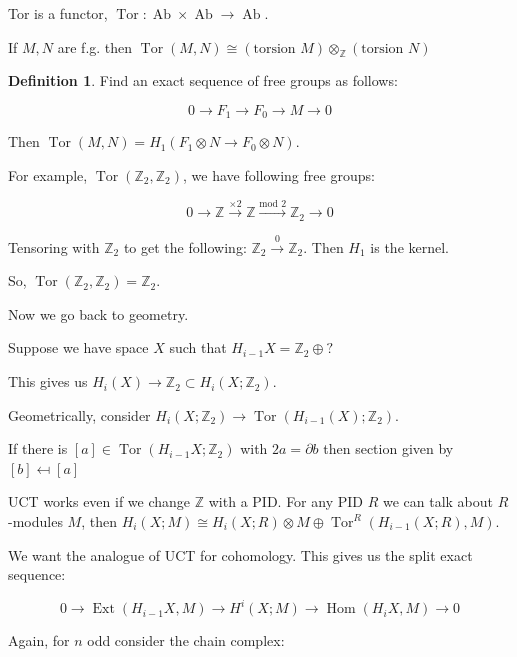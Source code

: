 \documentclass{article}
\theoremstyle{definition}
\newtheorem*{definition}{Definition}
\begin{document}
    Tor is a functor, \(\operatorname{Tor}: \operatorname{Ab} \times \operatorname{Ab} \to \operatorname{Ab}\).

    If \(M,N\) are f.g. then \(\operatorname{Tor} (M,N) \cong (\text{torsion } M) \otimes_\mathbb{Z} (\text{torsion } N)\) 

    \begin{definition}
        Find an exact sequence of free groups as follows:

        \[
            0 \to F_1 \to F_0 \to M \to 0
        \]

        Then \(\operatorname{Tor}(M,N) = H_1(F_1 \otimes N \to F_0 \otimes N)\).
    \end{definition}

    For example, \(\operatorname{Tor}(\mathbb{Z}_2, \mathbb{Z}_2)\), we have following free groups:

    \[
        0 \to \mathbb{Z} \xrightarrow{\times 2} \mathbb{Z} \xrightarrow{\text{mod } 2} \mathbb{Z}_2 \to 0
    \]

    Tensoring with \(\mathbb{Z}_2\) to get the following: \(\mathbb{Z}_2 \xrightarrow{0} \mathbb{Z}_2\). Then \(H_1\) is the kernel.

    So, \(\operatorname{Tor}(\mathbb{Z}_2, \mathbb{Z}_2) = \mathbb{Z}_2\).

    Now we go back to geometry.

    Suppose we have space \(X\) such that \(H_{i-1} X = \mathbb{Z}_2 \oplus ?\)

    This gives us \(H_i(X) \to \mathbb{Z}_2 \subset H_i(X;\mathbb{Z}_2)\).

    Geometrically, consider \(H_i(X;\mathbb{Z}_2) \to \operatorname{Tor}(H_{i-1} (X); \mathbb{Z}_2)\).
    
    If there is \([a] \in \operatorname{Tor}(H_{i-1} X; \mathbb{Z}_2)\) with \(2a = \partial b\) then section given by \([b] \mapsfrom [a]\)  

    UCT works even if we change \(\mathbb{Z}\) with a PID. For any PID \(R\) we can talk about \(R\)-modules \(M\), then \(H_i(X;M) \cong H_i(X;R) \otimes M \oplus \operatorname{Tor}^R(H_{i-1}(X;R),M)\).

    We want the analogue of UCT for cohomology. This gives us the split exact sequence:

    \[
        0 \to \operatorname{Ext}(H_{i-1} X, M) \to H^i(X;M) \to \operatorname{Hom}(H_i X, M) \to 0
    \] 

    Again, for \(n\) odd consider the chain complex:
\end{document}
